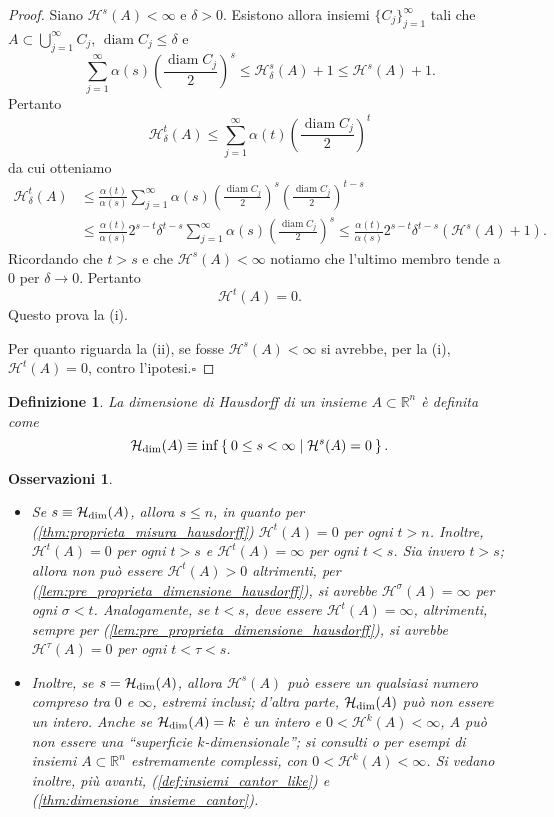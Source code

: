 \documentclass[a4paper,10pt,openright,oneside]{book}
\theoremstyle{theoremstyle}
\theoremstyle{theoremstylewoheader}
\theoremstyle{theoremstyle}
\newtheorem{definizione}[teorema]{Definizione}
\newtheorem{osservazioni}[teorema]{Osservazioni}
\theoremstyle{proofsecstyle}
\theoremstyle{nonumberplain}
\newtheorem{proof}{Dim.}
\newcommand{\RR}{\ensuremath{\mathbb{R}}}
\newcommand{\Haus}{\ensuremath{\mathcal{H}}}
\newcommand{\Hausdim}{\ensuremath{\Haus_\textup{dim}}}
\DeclareMathOperator{\diam}{diam}
\renewcommand{\qedsymbol}{\ensuremath{\square}}
\newcommand{\qed}{\unskip\nobreak\hfill\nobreak\hspace{.5em}\qedsymbol}
\begin{document}
\begin{proof}
Siano $\Haus^s(A) < \infty$ e $\delta > 0$. Esistono allora insiemi $\{C_j\}_{j=1}^\infty$ tali che $A \subset \bigcup_{j=1}^\infty C_j$, $\diam C_j \le \delta$ e
\[
\sum_{j=1}^\infty \alpha(s) \left(\frac{\diam C_j}{2}\right)^s \le \Haus_\delta^s(A) + 1 \le \Haus^s(A) + 1.
\]
Pertanto
\[
\Haus_\delta^t (A) \le \sum_{j=1}^\infty \alpha(t) \left(\frac{\diam C_j}{2}\right)^t
\]
da cui otteniamo
\begin{align*}
\Haus_\delta^t (A) &\le \frac{\alpha(t)}{\alpha(s)} \sum_{j=1}^\infty \alpha(s) \left(\frac{\diam C_j}{2}\right)^s \left(\frac{\diam C_j}{2}\right)^{t-s}\\
&\le \frac{\alpha(t)}{\alpha(s)} 2^{s-t} \delta^{t-s} \sum_{j=1}^\infty \alpha(s) \left(\frac{\diam C_j}{2}\right)^s \le \frac{\alpha(t)}{\alpha(s)} 2^{s-t} \delta^{t-s} (\Haus^s(A) + 1).
\end{align*}
Ricordando che $t > s$ e che $\Haus^s(A) < \infty$ notiamo che l'ultimo membro tende a 0 per $\delta \to 0$. Pertanto
\[
\Haus^t(A) = 0.
\]
Questo prova la (i).

Per quanto riguarda la (ii), se fosse $\Haus^s(A) < \infty$ si avrebbe, per la (i), $\Haus^t(A) = 0$, contro l'ipotesi.\qed
\end{proof}

\begin{definizione}
\label{def:dimensione_hausdorff}
La \emph{dimensione di Hausdorff} di un insieme $A \subset \RR^n$ è definita come
\[
\Hausdim(A) \equiv \inf\Set{ 0 \le s < \infty | \Haus^s(A) = 0 }.
\]
\end{definizione}

\begin{osservazioni}
\label{oss:proprieta_dimensione_hausdorff}
\mbox{}
\begin{itemize}
\item[(i)] Se $s \equiv \Hausdim(A)$, allora $s \le n$, in quanto per (\ref{thm:proprieta_misura_hausdorff}) $\Haus^t(A) = 0$ per ogni $t > n$. Inoltre, $\Haus^t(A) = 0$ per ogni $t > s$ e $\Haus^t(A) = \infty$ per ogni $t < s$. Sia invero $t > s$; allora non può essere $\Haus^t(A) > 0$ altrimenti, per (\ref{lem:pre_proprieta_dimensione_hausdorff}), si avrebbe $\Haus^\sigma(A) = \infty$ per ogni $\sigma < t$. Analogamente, se $t < s$, deve essere $\Haus^t(A) = \infty$, altrimenti, sempre per (\ref{lem:pre_proprieta_dimensione_hausdorff}), si avrebbe $\Haus^\tau(A) = 0$ per ogni $t < \tau < s$. 
\item[(ii)] Inoltre, se $s = \Hausdim(A)$, allora $\Haus^s(A)$ può essere un qualsiasi numero compreso tra $0$ e $\infty$, estremi inclusi; d'altra parte, $\Hausdim(A)$ può non essere un intero. Anche se $\Hausdim(A) = k$ è un intero e $0 < \Haus^k(A) < \infty$, $A$ può non essere una ``superficie $k$-dimensionale''; si consulti \cite{falconer} o \cite{federer} per esempi di insiemi $A \subset \RR^n$ estremamente complessi, con $0 < \Haus^k(A) < \infty$. Si vedano inoltre, più avanti, (\ref{def:insiemi_cantor_like}) e (\ref{thm:dimensione_insieme_cantor}).
\end{itemize}
\end{osservazioni}
\end{document}
